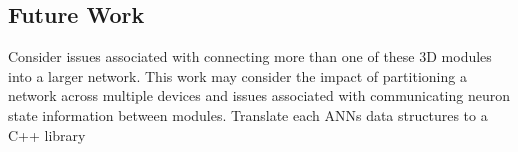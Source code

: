 \vspace{-1mm}
\subsection*{Future Work}
\label{sec:FutureWork}
\begin{outline}
\renewcommand{\outlinei}{enumerate}
  \vspace{-2mm}
  \1 Consider issues associated with connecting more than one of these 3D modules into a larger network.
This work may consider the impact of partitioning a network across multiple devices and issues associated with communicating neuron state information
between modules.
  \vspace{-3mm}
  \1 Translate each ANNs data structures to a C++ library
\end{outline}

